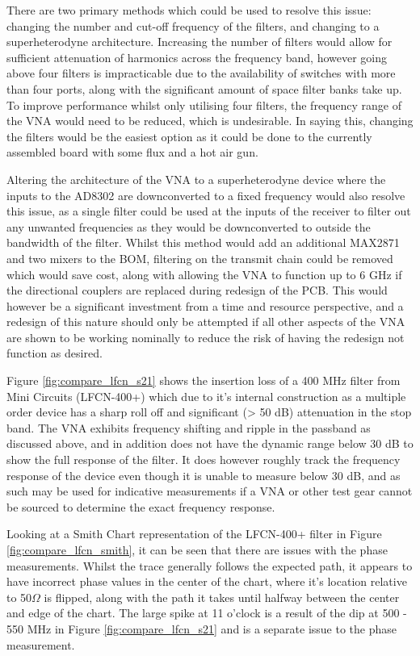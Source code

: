 There are two primary methods which could be used to resolve this issue: changing the number and cut-off frequency of the filters, and changing to a superheterodyne architecture. Increasing the number of filters would allow for sufficient attenuation of harmonics across the frequency band, however going above four filters is impracticable due to the availability of switches with more than four ports, along with the significant amount of space filter banks take up. To improve performance whilst only utilising four filters, the frequency range of the VNA would need to be reduced, which is undesirable. In saying this, changing the filters would be the easiest option as it could be done to the currently assembled board with some flux and a hot air gun. 

Altering the architecture of the VNA to a superheterodyne device where the inputs to the AD8302 are downconverted to a fixed frequency would also resolve this issue, as a single filter could be used at the inputs of the receiver to filter out any unwanted frequencies as they would be downconverted to outside the bandwidth of the filter. Whilst this method would add an additional MAX2871 and two mixers to the BOM, filtering on the transmit chain could be removed which would save cost, along with allowing the VNA to function up to 6 GHz if the directional couplers are replaced during redesign of the PCB. This would however be a significant investment from a time and resource perspective, and a redesign of this nature should only be attempted if all other aspects of the VNA are shown to be working nominally to reduce the risk of having the redesign not function as desired. 

Figure \ref{fig:compare_lfcn_s21} shows the insertion loss of a 400 MHz filter from Mini Circuits (LFCN-400+) which due to it's internal construction as a multiple order device has a sharp roll off and significant (> 50 dB) attenuation in the stop band. The VNA exhibits frequency shifting and ripple in the passband as discussed above, and in addition does not have the dynamic range below 30 dB to show the full response of the filter. It does however roughly track the frequency response of the device even though it is unable to measure below 30 dB, and as such may be used for indicative measurements if a VNA or other test gear cannot be sourced to determine the exact frequency response. 

Looking at a Smith Chart representation of the LFCN-400+ filter in Figure \ref{fig:compare_lfcn_smith}, it can be seen that there are issues with the phase measurements. Whilst the trace generally follows the expected path, it appears to have incorrect phase values in the center of the chart, where it's location relative to 50$\Omega$ is flipped, along with the path it takes until halfway between the center and edge of the chart. The large spike at 11 o'clock is a result of the dip at 500 - 550 MHz in Figure \ref{fig:compare_lfcn_s21} and is a separate issue to the phase measurement. 

